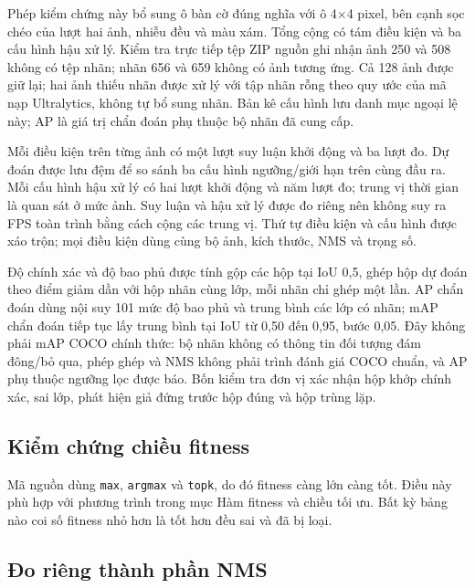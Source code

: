 \documentclass[a4paper,fleqn]{cas-dc}
\begin{document}
Phép kiểm chứng này bổ sung ô bàn cờ đúng nghĩa với ô 4×4 pixel, bên cạnh sọc chéo của lượt hai ảnh, nhiễu đều và màu xám. Tổng cộng có tám điều kiện và ba cấu hình hậu xử lý. Kiểm tra trực tiếp tệp ZIP nguồn ghi nhận ảnh 250 và 508 không có tệp nhãn; nhãn 656 và 659 không có ảnh tương ứng. Cả 128 ảnh được giữ lại; hai ảnh thiếu nhãn được xử lý với tập nhãn rỗng theo quy ước của mã nạp Ultralytics, không tự bổ sung nhãn. Bản kê cấu hình lưu danh mục ngoại lệ này; AP là giá trị chẩn đoán phụ thuộc bộ nhãn đã cung cấp.

Mỗi điều kiện trên từng ảnh có một lượt suy luận khởi động và ba lượt đo. Dự đoán được lưu đệm để so sánh ba cấu hình ngưỡng/giới hạn trên cùng đầu ra. Mỗi cấu hình hậu xử lý có hai lượt khởi động và năm lượt đo; trung vị thời gian là quan sát ở mức ảnh. Suy luận và hậu xử lý được đo riêng nên không suy ra FPS toàn trình bằng cách cộng các trung vị. Thứ tự điều kiện và cấu hình được xáo trộn; mọi điều kiện dùng cùng bộ ảnh, kích thước, NMS và trọng số.

Độ chính xác và độ bao phủ được tính gộp các hộp tại IoU 0,5, ghép hộp dự đoán theo điểm giảm dần với hộp nhãn cùng lớp, mỗi nhãn chỉ ghép một lần. AP chẩn đoán dùng nội suy 101 mức độ bao phủ và trung bình các lớp có nhãn; mAP chẩn đoán tiếp tục lấy trung bình tại IoU từ 0,50 đến 0,95, bước 0,05. Đây không phải mAP COCO chính thức: bộ nhãn không có thông tin đối tượng đám đông/bỏ qua, phép ghép và NMS không phải trình đánh giá COCO chuẩn, và AP phụ thuộc ngưỡng lọc được báo. Bốn kiểm tra đơn vị xác nhận hộp khớp chính xác, sai lớp, phát hiện giả đứng trước hộp đúng và hộp trùng lặp.

\subsection{Kiểm chứng chiều fitness}

Mã nguồn dùng \texttt{max}, \texttt{argmax} và \texttt{topk}, do đó fitness càng lớn càng tốt. Điều này phù hợp với phương trình trong mục Hàm fitness và chiều tối ưu. Bất kỳ bảng nào coi số fitness nhỏ hơn là tốt hơn đều sai và đã bị loại.

\subsection{Đo riêng thành phần NMS}
\end{document}
